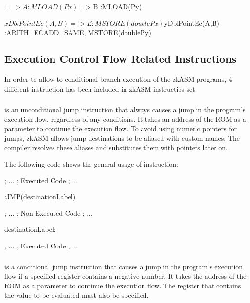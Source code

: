 \begin{zkasm}
$ => A  					:MLOAD(Px)
$ => B  					:MLOAD(Py)

${xDblPointEc(A,B)} => E  	:MSTORE(doublePx)
${yDblPointEc(A,B)} 		:ARITH_ECADD_SAME, MSTORE(doublePy)
\end{zkasm}









\subsection{Execution Control Flow Related Instructions}

In order to allow to conditional branch execution of the zkASM programs, 4 different instruction has been included in zkASM instructios set.

\subsubsection{\JMP} %
\JMP is an unconditional jump instruction that always causes a jump in the program's execution flow, regardless of any conditions. It takes an address of the ROM as a parameter to continue the execution flow. To avoid using numeric pointers for jumps, zkASM allows jump destinations to be aliased with custom names. The compiler resolves these aliases and substitutes them with pointers later on.

The following code shows the general usage of \JMP instruction:

\begin{zkasm}

; ...
; Executed Code
; ...

                :JMP(destinationLabel)

; ... 
; Non Executed Code
; ... 

destinationLabel:

; ...
; Executed Code
; ...

\end{zkasm}


\subsubsection{\JMPN} %

\JMPN is a conditional jump instruction that causes a jump in the program's execution flow if a specified register contains a negative number. It takes the address of the ROM as a parameter to continue the execution flow. The register that contains the value to be evaluated must also be specified.

